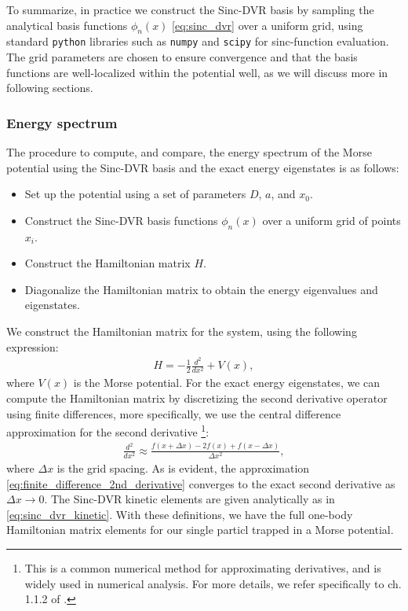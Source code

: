 \documentclass{subfiles}
\begin{document}
To summarize, in practice we construct the Sinc-DVR basis by sampling the analytical basis functions $\phi_n(x)$ \eqref{eq:sinc_dvr} over a uniform grid, using standard \texttt{python} libraries such as \texttt{numpy} and \texttt{scipy} for sinc-function evaluation. The grid parameters are chosen to ensure convergence and that the basis functions are well-localized within the potential well, as we will discuss more in following sections. 
\subsubsection*{Energy spectrum} 
The procedure to compute, and compare, the energy spectrum of the Morse potential using the Sinc-DVR basis and the exact energy eigenstates is as follows:
\begin{itemize}
    \item Set up the potential using a set of parameters $D$, $a$, and $x_0$.
    \item Construct the Sinc-DVR basis functions $\phi_n(x)$ over a uniform grid of points $x_i$.
    \item Construct the Hamiltonian matrix $H$.
    \item Diagonalize the Hamiltonian matrix to obtain the energy eigenvalues and eigenstates.
\end{itemize}
We construct the Hamiltonian matrix for the system, using the following expression:
\begin{align*}
    H = -\frac{1}{2} \frac{d^2}{dx^2} + V(x),
\end{align*}
where $V(x)$ is the Morse potential. For the exact energy eigenstates, we can compute the Hamiltonian matrix by discretizing the second derivative operator using finite differences, more specifically, we use the central difference approximation for the second derivative \cite{langtangen2017finite}\footnote{This is a common numerical method for approximating derivatives, and is widely used in numerical analysis. For more details, we refer specifically to ch. 1.1.2 of \cite{langtangen2017finite}.}:
\begin{align}
    \frac{d^2}{dx^2} \approx \frac{f(x + \Delta x) - 2f(x) + f(x - \Delta x)}{\Delta x^2}\label{eq:finite_difference_2nd_derivative}, 
\end{align}
where $\Delta x$ is the grid spacing. As is evident, the approximation \eqref{eq:finite_difference_2nd_derivative} converges to the exact second derivative as $\Delta x \to 0$. The Sinc-DVR kinetic elements are given analytically as in \eqref{eq:sinc_dvr_kinetic}. With these definitions, we have the full one-body Hamiltonian matrix elements for our single particl trapped in a Morse potential.
\end{document}

